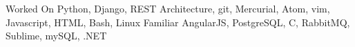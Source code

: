 \begin{cvskills}
  \cvskill
    {Worked On}
    {Python, Django, REST Architecture, git, Mercurial, Atom, vim, Javascript, HTML, Bash, Linux}
  \cvskill
    {Familiar}
    {AngularJS, PostgreSQL, C, RabbitMQ, Sublime, mySQL, .NET}
\end{cvskills}
